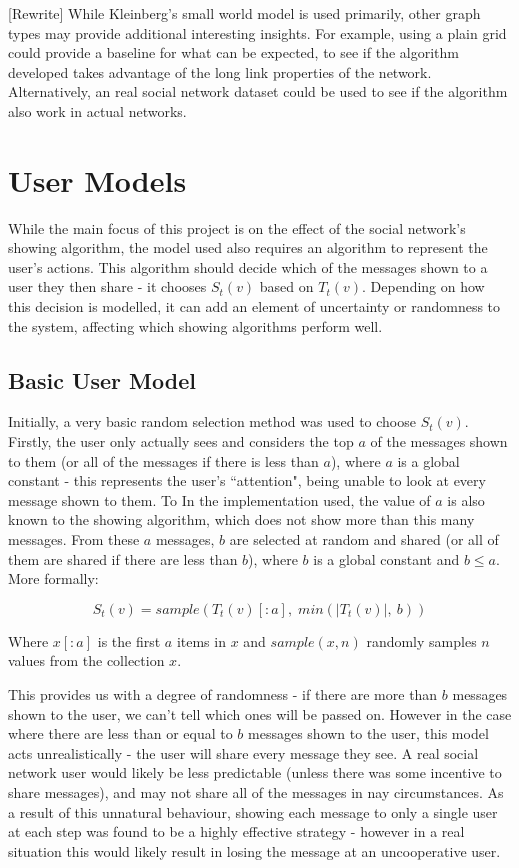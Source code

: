 \documentclass[bsc,frontabs,twoside,singlespacing,parskip,deptreport]{infthesis}     %
\begin{document}
[Rewrite] While Kleinberg's small world model is used primarily, other graph types may provide additional interesting insights. For example, using a plain grid could provide a baseline for what can be expected, to see if the algorithm developed takes advantage of the long link properties of the network. Alternatively, an real social network dataset could be used to see if the algorithm also work in actual networks.

\section{User Models} \label{sec:user_models}
While the main focus of this project is on the effect of the social network's showing algorithm, the model used also requires an algorithm to represent the user's actions. This algorithm should decide which of the messages shown to a user they then share - it chooses $S_{t}(v)$ based on $T_{t}(v)$. Depending on how this decision is modelled, it can add an element of uncertainty or randomness to the system, affecting which showing algorithms perform well.

\subsection{Basic User Model}
Initially, a very basic random selection method was used to choose $S_{t}(v)$. Firstly, the user only actually sees and considers the top $a$ of the messages shown to them (or all of the messages if there is less than $a$), where $a$ is a global constant - this represents the user's ``attention", being unable to look at every message shown to them. To In the implementation used, the value of $a$ is also known to the showing algorithm, which does not show more than this many messages. From these $a$ messages, $b$ are selected at random and shared (or all of them are shared if there are less than $b$), where $b$ is a global constant and $b \le a$. More formally:

\begin{equation}
S_{t}(v) = sample(T_{t}(v)[:a], \; min(|T_{t}(v)|,\: b))
\end{equation}

Where $x[:a]$ is the first $a$ items in $x$ and $sample(x, n)$ randomly samples $n$ values from the collection $x$.

This provides us with a degree of randomness - if there are more than $b$ messages shown to the user, we can't tell which ones will be passed on. However in the case where there are less than or equal to $b$ messages shown to the user, this model acts unrealistically - the user will share every message they see. A real social network user would likely be less predictable (unless there was some incentive to share messages), and may not share all of the messages in nay circumstances. As a result of this unnatural behaviour, showing each message to only a single user at each step was found to be a highly effective strategy - however in a real situation this would likely result in losing the message at an uncooperative user.
\end{document}
